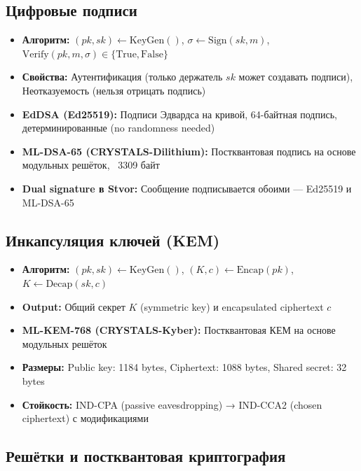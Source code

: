 \documentclass[11pt,a4paper,oneside]{book}
\begin{document}
\vspace{-0.2cm}\subsection{Цифровые подписи}
\begin{itemize}
  \item \textbf{Алгоритм:} $(pk, sk) \leftarrow \text{KeyGen}()$, $\sigma \leftarrow \text{Sign}(sk, m)$, $\text{Verify}(pk, m, \sigma) \in \{\text{True}, \text{False}\}$
  \item \textbf{Свойства:} Аутентификация (только держатель $sk$ может создавать подписи), Неотказуемость (нельзя отрицать подпись)
  \item \textbf{EdDSA (Ed25519):} Подписи Эдвардса на кривой, 64-байтная подпись, детерминированные (no randomness needed)
  \item \textbf{ML-DSA-65 (CRYSTALS-Dilithium):} Постквантовая подпись на основе модульных решёток, ~3309 байт
  \item \textbf{Dual signature в Stvor:} Сообщение подписывается обоими — Ed25519 и ML-DSA-65
\end{itemize}
\vspace{-0.2cm}\subsection{Инкапсуляция ключей (KEM)}
\begin{itemize}
  \item \textbf{Алгоритм:} $(pk, sk) \leftarrow \text{KeyGen}()$, $(K, c) \leftarrow \text{Encap}(pk)$, $K \leftarrow \text{Decap}(sk, c)$
  \item \textbf{Output:} Общий секрет $K$ (symmetric key) и encapsulated ciphertext $c$
  \item \textbf{ML-KEM-768 (CRYSTALS-Kyber):} Постквантовая КЕМ на основе модульных решёток
  \item \textbf{Размеры:} Public key: 1184 bytes, Ciphertext: 1088 bytes, Shared secret: 32 bytes
  \item \textbf{Стойкость:} IND-CPA (passive eavesdropping) → IND-CCA2 (chosen ciphertext) с модификациями
\end{itemize}
\vspace{-0.2cm}\subsection{Решётки и постквантовая криптография}
\end{document}
